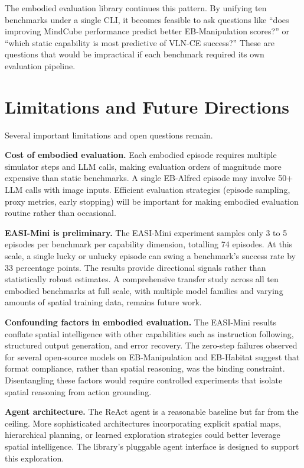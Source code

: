 The embodied evaluation library continues this pattern. By unifying ten benchmarks under a single CLI, it becomes feasible to ask questions like ``does improving MindCube performance predict better EB-Manipulation scores?'' or ``which static capability is most predictive of VLN-CE success?'' These are questions that would be impractical if each benchmark required its own evaluation pipeline.

\section{Limitations and Future Directions}

Several important limitations and open questions remain.

\textbf{Cost of embodied evaluation.} Each embodied episode requires multiple simulator steps and LLM calls, making evaluation orders of magnitude more expensive than static benchmarks. A single EB-Alfred episode may involve 50+ LLM calls with image inputs. Efficient evaluation strategies (episode sampling, proxy metrics, early stopping) will be important for making embodied evaluation routine rather than occasional.

\textbf{EASI-Mini is preliminary.} The EASI-Mini experiment samples only 3 to 5 episodes per benchmark per capability dimension, totalling 74 episodes. At this scale, a single lucky or unlucky episode can swing a benchmark's success rate by 33 percentage points. The results provide directional signals rather than statistically robust estimates. A comprehensive transfer study across all ten embodied benchmarks at full scale, with multiple model families and varying amounts of spatial training data, remains future work.

\textbf{Confounding factors in embodied evaluation.} The EASI-Mini results conflate spatial intelligence with other capabilities such as instruction following, structured output generation, and error recovery. The zero-step failures observed for several open-source models on EB-Manipulation and EB-Habitat suggest that format compliance, rather than spatial reasoning, was the binding constraint. Disentangling these factors would require controlled experiments that isolate spatial reasoning from action grounding.

\textbf{Agent architecture.} The ReAct agent is a reasonable baseline but far from the ceiling. More sophisticated architectures incorporating explicit spatial maps, hierarchical planning, or learned exploration strategies could better leverage spatial intelligence. The library's pluggable agent interface is designed to support this exploration.


